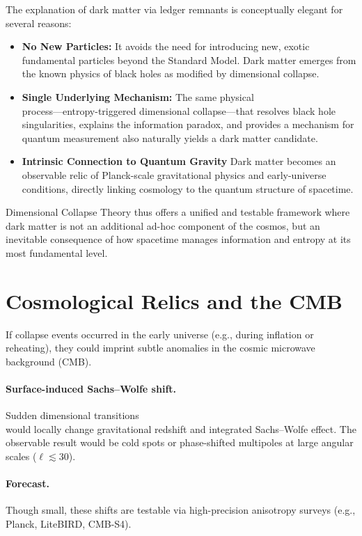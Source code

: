 \documentclass[a4paper, 12pt, oneside]{book}
\numberwithin{equation}{chapter}
\begin{document}
The explanation of dark matter via ledger remnants is conceptually elegant for several reasons:
\begin{itemize}
    \item \textbf{No New Particles:} It avoids the need for introducing new, exotic fundamental particles beyond the Standard Model. Dark matter emerges from the known physics of black holes as modified by dimensional collapse.
    \item \textbf{Single Underlying Mechanism:} The same physical \\ process—entropy-triggered dimensional collapse—that resolves black hole singularities, explains the information paradox, and provides a mechanism for quantum measurement also naturally yields a dark matter candidate.
    \item \textbf{Intrinsic Connection to Quantum Gravity} Dark matter becomes an observable relic of Planck-scale gravitational physics and early-universe conditions, directly linking cosmology to the quantum structure of spacetime.
\end{itemize}
Dimensional Collapse Theory thus offers a unified and testable framework where dark matter is not an additional ad-hoc component of the cosmos, but an inevitable consequence of how spacetime manages information and entropy at its most fundamental level.

\section{Cosmological Relics and the CMB}
\label{sec:CMB}

If collapse events occurred in the early universe (e.g., during inflation or reheating),
they could imprint subtle anomalies in the cosmic microwave background (CMB).

\paragraph{Surface-induced Sachs–Wolfe shift.}
Sudden dimensional transitions \\ would locally change gravitational redshift and
integrated Sachs–Wolfe effect. The observable result would be cold spots or phase-shifted
multipoles at large angular scales (\( \ell \lesssim 30 \)).

\paragraph{Forecast.}
Though small, these shifts are testable via high-precision anisotropy surveys
(e.g., Planck, LiteBIRD, CMB-S4).
\end{document}
